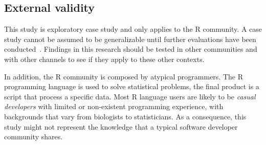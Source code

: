 \documentclass{sig-alternate-05-2015}
\begin{document}


\subsection{External validity}

	This study is exploratory case study and only applies to the R community.
	A case study cannot be assumed to be generalizable until further evaluations have been conducted~\cite{Yin2009}.
	Findings in this research should be tested in other communities and with other channels to see if they apply to these other contexts.

    In addition, the R community is composed by atypical programmers.
    The R programming language is used to solve statistical problems, the final product is a script that process a specific data.
    Most R language users are likely to be \textit{casual developers} with limited or non-existent programming experience, with backgrounds that vary from biologists to statisticians.
	As a consequence, this study might not represent the knowledge that a typical software developer community shares.

\end{document}
